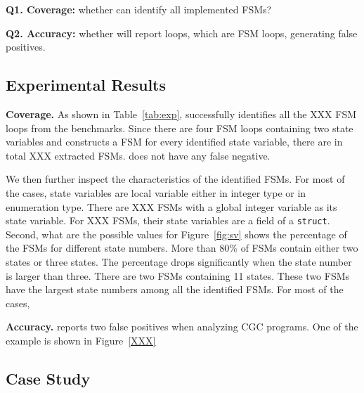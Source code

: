 \textbf{Q1. Coverage:} whether \Tool{} can identify all implemented FSMs?
 
\textbf{Q2. Accuracy:} whether \Tool{} will report loops, which are FSM loops, 
generating false positives. 

\subsection{Experimental Results}



\noindent\textbf{Coverage.}
As shown in Table~\ref{tab:exp}, \Tool{} successfully identifies 
all the {\color{red} XXX} FSM loops 
from the benchmarks. Since there are four FSM loops containing 
two state variables and \Tool{} constructs a FSM for every identified state variable, 
there are in total {\color{red} XXX} extracted FSMs. 
\Tool{} does not have any false negative.



We then further inspect the characteristics of the identified FSMs. 
For most of the cases, state variables are local variable either in integer type or in 
enumeration type. There are {\color{red} XXX} FSMs with a global integer variable
as its state variable. For {\color{red} XXX} FSMs, 
their state variables are a field of a \texttt{struct}. 
Second, what are the possible values for 
Figure~\ref{fig:sv} shows the percentage of the FSMs for different state numbers. 
More than 80\% of FSMs contain either two states or three states. 
The percentage drops significantly when the state number is larger than three. 
There are two FSMs containing 11 states. 
These two FSMs have the largest state numbers among all the identified FSMs. 
For most of the cases,

\noindent\textbf{Accuracy.}
\Tool{} reports two false positives when analyzing CGC programs. 
One of the example is shown in Figure~\ref{XXX}


\subsection{Case Study}